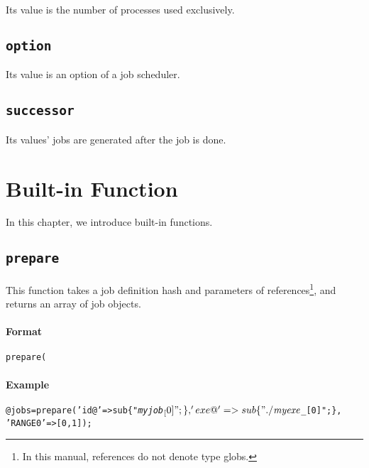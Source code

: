 \documentclass[a4paper,10pt]{report}
\begin{document}
Its value is the number of processes used exclusively.

\section{\texttt{option}}

Its value is an option of a job scheduler.

\section{\texttt{successor}}

Its values' jobs are generated after the job is done.
\fi

\chapter{Built-in Function}\label{chapfun}

In this chapter, we introduce built-in functions.

\def\format{Format}
\def\example{Example}
\def\advanced{Advanced}

\section{\texttt{prepare}}\label{sec:prepare}

This function takes a job definition hash and parameters of
references\footnote{In this manual, references do not denote type
globs.}, and returns an array of job objects.


\subsubsection{\format}

\begin{boxnote}
\begin{alltt}
prepare(%template);
\end{alltt}
\end{boxnote}
\vspace{\baselineskip}

\subsubsection{\example}

\begin{boxnote}
\begin{alltt}
@jobs = prepare('id@' => sub \{ "\textit{myjob}$_[0]"; \},
                'exe@' => sub \{ "./\textit{myexe} $_[0]"; \},
                'RANGE0' => [0,1]);
\end{alltt}
\end{boxnote}
\vspace{\baselineskip}
\end{document}

